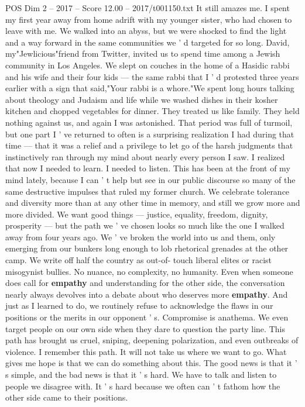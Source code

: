 \begin{textsample}{POS Dim 2 – 2017 – Score 12.00 – 2017/t001150.txt}
It still amazes me.
I spent my first year away from home adrift with my younger sister, who had chosen to leave with me.
We walked into an abyss, but we were shocked to find the light and a way forward in the same communities we ' d targeted for so long.
David, my"Jewlicious"friend from Twitter, invited us to spend time among a Jewish community in Los Angeles.
We slept on couches in the home of a Hasidic rabbi and his wife and their four kids — the same rabbi that I ' d protested three years earlier with a sign that said,"Your rabbi is a whore."We spent long hours talking about theology and Judaism and life while we washed dishes in their kosher kitchen and chopped vegetables for dinner.
They treated us like family.
They held nothing against us, and again I was astonished.
That period was full of turmoil, but one part I ' ve returned to often is a surprising realization I had during that time — that it was a relief and a privilege to let go of the harsh judgments that instinctively ran through my mind about nearly every person I saw.
I realized that now I needed to learn.
I needed to listen.
This has been at the front of my mind lately, because I can ' t help but see in our public discourse so many of the same destructive impulses that ruled my former church.
We celebrate tolerance and diversity more than at any other time in memory, and still we grow more and more divided.
We want good things — justice, equality, freedom, dignity, prosperity — but the path we ' ve chosen looks so much like the one I walked away from four years ago.
We ' ve broken the world into us and them, only emerging from our bunkers long enough to lob rhetorical grenades at the other camp.
We write off half the country as out-of- touch liberal elites or racist misogynist bullies.
No nuance, no complexity, no humanity.
Even when someone does call for \textbf{empathy} and understanding for the other side, the conversation nearly always devolves into a debate about who deserves more \textbf{empathy}.
And just as I learned to do, we routinely refuse to acknowledge the flaws in our positions or the merits in our opponent ' s.
Compromise is anathema.
We even target people on our own side when they dare to question the party line.
This path has brought us cruel, sniping, deepening polarization, and even outbreaks of violence.
I remember this path.
It will not take us where we want to go.
What gives me hope is that we can do something about this.
The good news is that it ' s simple, and the bad news is that it ' s hard.
We have to talk and listen to people we disagree with.
It ' s hard because we often can ' t fathom how the other side came to their positions.

\end{textsample}
